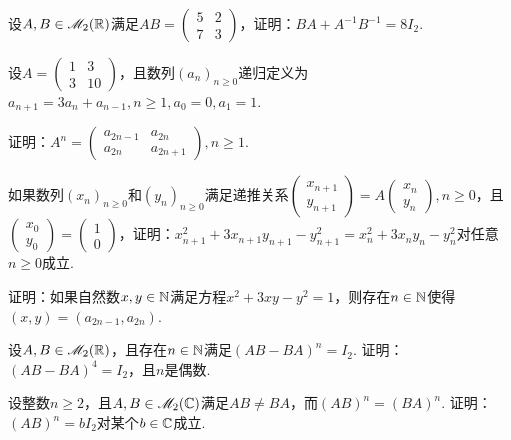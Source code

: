\begin{problem}
  设$A,B\in\mathscr M_2(\mathbb R)$满足$AB=\begin{pmatrix}
    5 & 2 \\
    7 & 3
  \end{pmatrix}$，证明：$BA+A^{-1}B^{-1}=8I_2$.
\end{problem}

\begin{problem}
  设$A=\begin{pmatrix}
    1 & 3 \\
    3 & 10
  \end{pmatrix}$，且数列$(a_n)_{n\ge0}$递归定义为$a_{n+1}=3a_n+a_{n-1},n\ge1,a_0=0,a_1=1$.
  \begin{enum}
    \item 证明：$A^n=\begin{pmatrix}
      a_{2n-1} & a_{2n} \\
      a_{2n} & a_{2n+1}
    \end{pmatrix},n\ge1$.
    \item 如果数列$(x_n)_{n\ge0}$和$(y_n)_{n\ge0}$满足递推关系$\begin{pmatrix}
          x_{n+1} \\ y_{n+1}
        \end{pmatrix}=A\begin{pmatrix}
          x_n \\ y_n
        \end{pmatrix},n\ge0$，且$\begin{pmatrix}
          x_0 \\ y_0
        \end{pmatrix}=\begin{pmatrix}
          1 \\ 0
        \end{pmatrix}$，证明：$x_{n+1}^2+3x_{n+1}y_{n+1}-y_{n+1}^2=
        x_n^2+3x_ny_n-y_n^2$对任意$n\ge0$成立.
    \item 证明：如果自然数$x,y\in\mathbb N$满足方程$x^2+3xy-y^2=1$，则存在$n\in\mathbb N$使得$(x,y)=(a_{2n-1},a_{2n})$.
  \end{enum}
\end{problem}

\begin{problem}
  设$A,B\in\mathscr M_2(\mathbb R)$，且存在$n\in\mathbb N$满足$(AB-BA)^n=I_2$. 证明：$(AB-BA)^4=I_2$，且$n$是偶数.
\end{problem}

\begin{problem}
  设整数$n\ge2$，且$A,B\in\mathscr M_2(\mathbb C)$满足$AB\ne BA$，而$(AB)^n=(BA)^n$. 证明：$(AB)^n=bI_2$对某个$b\in\mathbb C$成立.
\end{problem}

